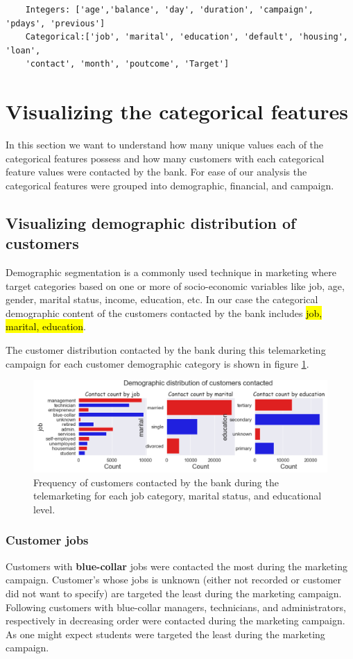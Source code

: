 \begin{verbatim}
    Integers: ['age','balance', 'day', 'duration', 'campaign', 'pdays', 'previous']
    Categorical:['job', 'marital', 'education', 'default', 'housing', 'loan', 
    'contact', 'month', 'poutcome', 'Target']
\end{verbatim}

\section{Visualizing the categorical features}

In this section we want to understand how many unique values each of the categorical features possess and how many customers with each categorical feature values were contacted by the bank. For ease of our analysis the categorical features were grouped into demographic, financial, and campaign.

\subsection{Visualizing demographic distribution of customers}
Demographic segmentation is a commonly used technique in marketing where target categories based on one or more of socio-economic variables like job, age, gender, marital status, income, education, etc. In our case the categorical demographic content of the customers contacted by the bank includes \hl{job, marital, education}.

The customer distribution contacted by the bank during this telemarketing campaign for each customer demographic category is shown in figure \ref{fig:cat_demo_count}.

\begin{figure}[tbh]
\centering
\includegraphics[width = 1.0\hsize]{./resources/img/fig_cat_demo_count.png}
\caption{Frequency of customers contacted by the bank during the telemarketing for each job category, marital status, and educational level.} 
\label{fig:cat_demo_count}
\end{figure}

\subsubsection*{Customer jobs}
Customers with {\color{blue} \textbf{blue-collar}} jobs were contacted the most during the marketing campaign. Customer's whose jobs is unknown (either not recorded or customer did not want to specify) are targeted the least during the marketing campaign. Following customers with blue-collar managers, technicians, and administrators, respectively in decreasing order were contacted during the marketing campaign. As one might expect students were targeted the least during the marketing campaign.

